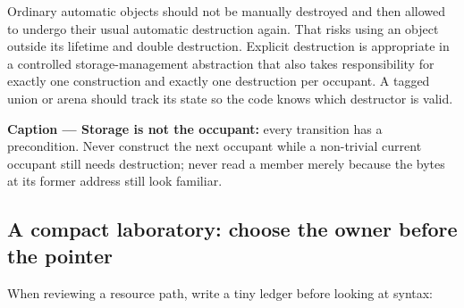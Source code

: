 Ordinary automatic objects should not be manually destroyed and then allowed to undergo their usual automatic destruction again. That risks using an object outside its lifetime and double destruction. Explicit destruction is appropriate in a controlled storage-management abstraction that also takes responsibility for exactly one construction and exactly one destruction per occupant. A tagged union or arena should track its state so the code knows which destructor is valid.


\textbf{Caption --- Storage is not the occupant:} every transition has a precondition. Never construct the next occupant while a non-trivial current occupant still needs destruction; never read a member merely because the bytes at its former address still look familiar.

\subsection{A compact laboratory: choose the owner before the pointer}\label{01-foundations-i-ch004-a-compact-laboratory-choose-the-owner-before-the-pointer}

\hypertarget{01-foundations-i-ch004-a-compact-laboratory-choose-the-owner-before-the-pointer}{}

When reviewing a resource path, write a tiny ledger before looking at syntax:


